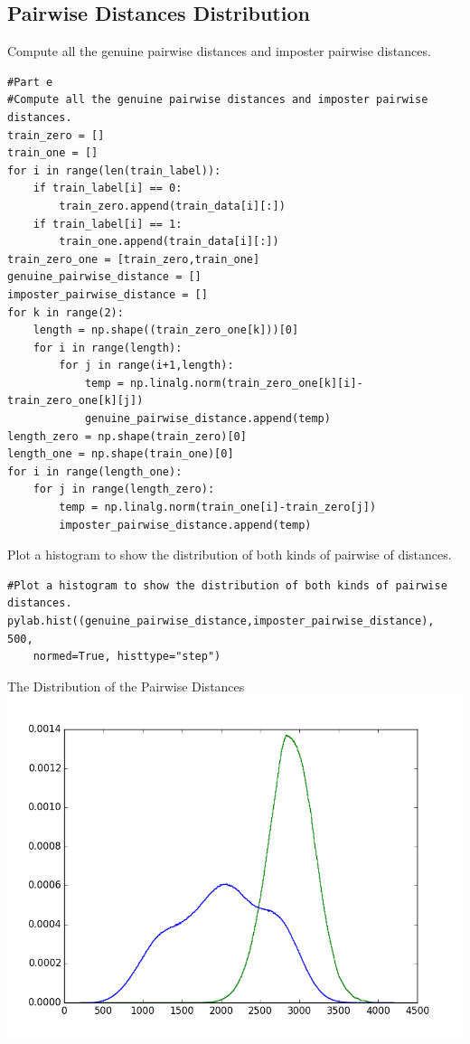 \documentclass[a4paper]{article}
\begin{document}
\subsection*{Pairwise Distances Distribution}
Compute all the genuine pairwise distances and imposter pairwise distances.
\begin{lstlisting}
#Part e
#Compute all the genuine pairwise distances and imposter pairwise distances.
train_zero = []
train_one = []
for i in range(len(train_label)):
    if train_label[i] == 0:
        train_zero.append(train_data[i][:])
    if train_label[i] == 1:
        train_one.append(train_data[i][:]) 
train_zero_one = [train_zero,train_one]
genuine_pairwise_distance = []
imposter_pairwise_distance = []
for k in range(2):
    length = np.shape((train_zero_one[k]))[0]
    for i in range(length):
        for j in range(i+1,length):
            temp = np.linalg.norm(train_zero_one[k][i]-train_zero_one[k][j])
            genuine_pairwise_distance.append(temp)
length_zero = np.shape(train_zero)[0]
length_one = np.shape(train_one)[0]
for i in range(length_one):
    for j in range(length_zero):
        temp = np.linalg.norm(train_one[i]-train_zero[j])
        imposter_pairwise_distance.append(temp)
\end{lstlisting}
Plot a histogram to show the distribution of both kinds of pairwise of distances.
\begin{lstlisting}
#Plot a histogram to show the distribution of both kinds of pairwise distances.
pylab.hist((genuine_pairwise_distance,imposter_pairwise_distance), 500, 
	normed=True, histtype="step")
\end{lstlisting}
\begin{center}
The Distribution of the Pairwise Distances
\includegraphics[scale=0.63]{pairwise_distance.png}
\end{center}
\end{document}
